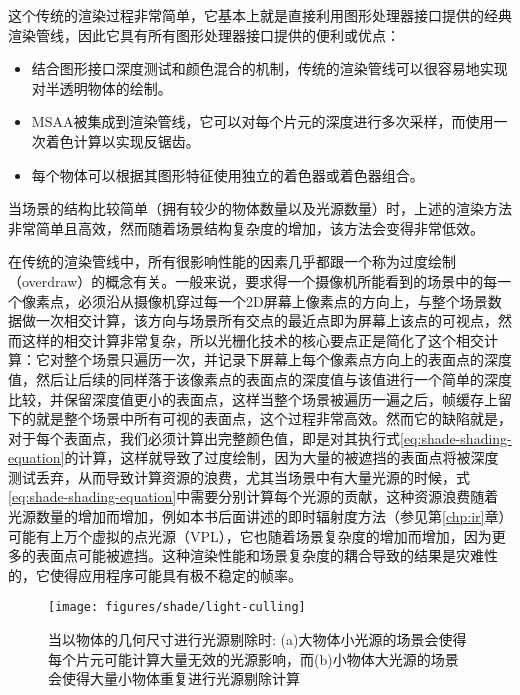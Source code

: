 这个传统的渲染过程非常简单，它基本上就是直接利用图形处理器接口提供的经典渲染管线，因此它具有所有图形处理器接口提供的便利或优点：

\begin{itemize}
	\item 结合图形接口深度测试和颜色混合的机制，传统的渲染管线可以很容易地实现对半透明物体的绘制。
	\item MSAA被集成到渲染管线，它可以对每个片元的深度进行多次采样，而使用一次着色计算以实现反锯齿。
	\item 每个物体可以根据其图形特征使用独立的着色器或着色器组合。
\end{itemize}

当场景的结构比较简单（拥有较少的物体数量以及光源数量）时，上述的渲染方法非常简单且高效，然而随着场景结构复杂度的增加，该方法会变得非常低效。

在传统的渲染管线中，所有很影响性能的因素几乎都跟一个称为过度绘制（overdraw）的概念有关。一般来说，要求得一个摄像机所能看到的场景中的每一个像素点，必须沿从摄像机穿过每一个2D屏幕上像素点的方向上，与整个场景数据做一次相交计算，该方向与场景所有交点的最近点即为屏幕上该点的可视点，然而这样的相交计算非常复杂，所以光栅化技术的核心要点正是简化了这个相交计算：它对整个场景只遍历一次，并记录下屏幕上每个像素点方向上的表面点的深度值，然后让后续的同样落于该像素点的表面点的深度值与该值进行一个简单的深度比较，并保留深度值更小的表面点，这样当整个场景被遍历一遍之后，帧缓存上留下的就是整个场景中所有可视的表面点，这个过程非常高效。然而它的缺陷就是，对于每个表面点，我们必须计算出完整颜色值，即是对其执行式\ref{eq:shade-shading-equation}的计算，这样就导致了过度绘制，因为大量的被遮挡的表面点将被深度测试丢弃，从而导致计算资源的浪费，尤其当场景中有大量光源的时候，式\ref{eq:shade-shading-equation}中需要分别计算每个光源的贡献，这种资源浪费随着光源数量的增加而增加，例如本书后面讲述的即时辐射度方法（参见第\ref{chp:ir}章）可能有上万个虚拟的点光源（VPL），它也随着场景复杂度的增加而增加，因为更多的表面点可能被遮挡。这种渲染性能和场景复杂度的耦合导致的结果是灾难性的，它使得应用程序可能具有极不稳定的帧率。

\begin{figure}
\begin{center}
	\texttt{[image: figures/shade/light-culling]}
\end{center}
	\caption{当以物体的几何尺寸进行光源剔除时: (a)大物体小光源的场景会使得每个片元可能计算大量无效的光源影响，而(b)小物体大光源的场景会使得大量小物体重复进行光源剔除计算}
	\label{f:shade-light-culling}
\end{figure}

